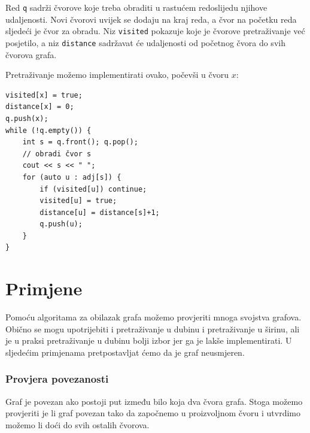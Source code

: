 Red \texttt{q}
sadrži čvorove koje treba obraditi
u rastućem redoslijedu njihove udaljenosti.
Novi čvorovi uvijek se dodaju na kraj
reda, a čvor na početku
reda sljedeći je čvor za obradu.
Niz \texttt{visited} pokazuje
koje je čvorove pretraživanje već posjetilo,
a niz \texttt{distance} sadržavat će
udaljenosti od početnog čvora do svih čvorova grafa.

Pretraživanje možemo implementirati ovako,
počevši u čvoru $x$:
\begin{lstlisting}
visited[x] = true;
distance[x] = 0;
q.push(x);
while (!q.empty()) {
    int s = q.front(); q.pop();
    // obradi čvor s
    cout << s << " ";
    for (auto u : adj[s]) {
        if (visited[u]) continue;
        visited[u] = true;
        distance[u] = distance[s]+1;
        q.push(u);
    }
}
\end{lstlisting}

\section{Primjene}

Pomoću algoritama za obilazak grafa
možemo provjeriti mnoga svojstva grafova.
Obično se mogu upotrijebiti i pretraživanje u dubinu
i pretraživanje u širinu,
ali je u praksi pretraživanje u dubinu
bolji izbor jer ga je
lakše implementirati.
U sljedećim primjenama
pretpostavljat ćemo da je graf neusmjeren.

\subsubsection{Provjera povezanosti}


Graf je povezan ako postoji put
između bilo koja dva čvora grafa.
Stoga možemo provjeriti je li graf povezan
tako da započnemo u proizvoljnom čvoru i
utvrdimo možemo li doći do svih ostalih čvorova.

